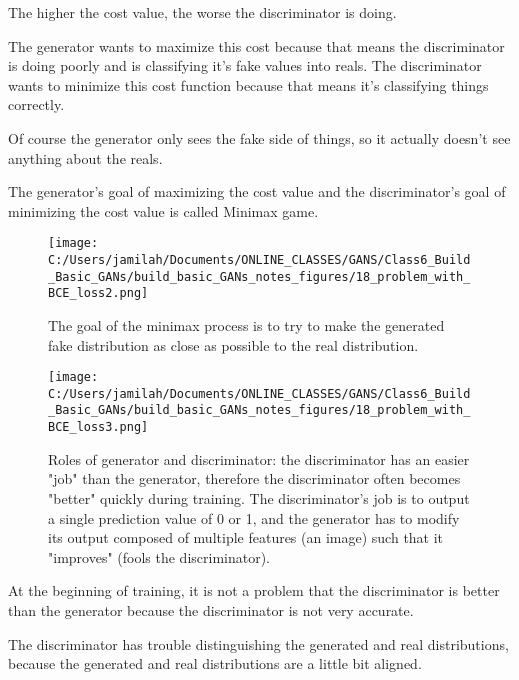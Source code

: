 \documentclass[11pt, onecolumn]{article}
\begin{document}
\begin{itemize}
The higher the cost value, the worse the discriminator is doing.

The generator wants to maximize this cost because that means the discriminator is doing poorly and is classifying it's fake values into reals. The discriminator wants to minimize this cost function because that means it's classifying things correctly.

Of course the generator only sees the fake side of things, so it actually doesn't see anything about the reals.

The generator's goal of maximizing the cost value and the discriminator’s goal of minimizing the cost value is called Minimax game.

\begin{figure}[htp]
\begin{center}
\texttt{[image: C:/Users/jamilah/Documents/ONLINE\_CLASSES/GANS/Class6\_Build\_Basic\_GANs/build\_basic\_GANs\_notes\_figures/18\_problem\_with\_BCE\_loss2.png]}
\end{center}
\caption{The goal of the minimax process is to try to make the generated fake distribution as close as possible to the real distribution.}
\label{18_problem_with_BCE_loss2}
\end{figure}

\begin{figure}[htp]
\begin{center}
\texttt{[image: C:/Users/jamilah/Documents/ONLINE\_CLASSES/GANS/Class6\_Build\_Basic\_GANs/build\_basic\_GANs\_notes\_figures/18\_problem\_with\_BCE\_loss3.png]}
\end{center}
\caption{Roles of generator and discriminator: the discriminator has an easier "job" than the generator, therefore the discriminator often becomes "better" quickly during training.  The discriminator's job is to output a single prediction value of 0 or 1, and the generator has to modify its output composed of multiple features (an image) such that it "improves" (fools the discriminator).}
\label{18_problem_with_BCE_loss3}
\end{figure}

At the beginning of training, it is not a problem that the discriminator is better than the generator because the discriminator is not very accurate.

The discriminator has trouble distinguishing the generated and real distributions, because the generated and real distributions are a little bit aligned.


\end{itemize}
\end{document}
